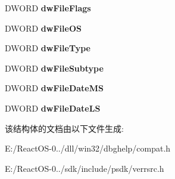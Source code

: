 \begin{DoxyCompactItemize}
\item 
\mbox{\label{structtag_v_s___f_i_x_e_d_f_i_l_e_i_n_f_o_ad9b248f2dfa572f6acb52eb2ff4ae14f}} 
D\+W\+O\+RD {\bfseries dw\+File\+Flags}
\item 
\mbox{\label{structtag_v_s___f_i_x_e_d_f_i_l_e_i_n_f_o_a16df3dd0691d11173a57c52cc67a4fd6}} 
D\+W\+O\+RD {\bfseries dw\+File\+OS}
\item 
\mbox{\label{structtag_v_s___f_i_x_e_d_f_i_l_e_i_n_f_o_a712ee7c0b1cbca219ac582b4bf07517f}} 
D\+W\+O\+RD {\bfseries dw\+File\+Type}
\item 
\mbox{\label{structtag_v_s___f_i_x_e_d_f_i_l_e_i_n_f_o_ae5fa0522fb4be66a3862f85494f48ae6}} 
D\+W\+O\+RD {\bfseries dw\+File\+Subtype}
\item 
\mbox{\label{structtag_v_s___f_i_x_e_d_f_i_l_e_i_n_f_o_af1310e673f25686d5355e8a2799fac11}} 
D\+W\+O\+RD {\bfseries dw\+File\+Date\+MS}
\item 
\mbox{\label{structtag_v_s___f_i_x_e_d_f_i_l_e_i_n_f_o_a4165bdb65db75b917511997445167777}} 
D\+W\+O\+RD {\bfseries dw\+File\+Date\+LS}
\end{DoxyCompactItemize}


该结构体的文档由以下文件生成\+:\begin{DoxyCompactItemize}
\item 
E\+:/\+React\+O\+S-\/0../dll/win32/dbghelp/compat.\+h\item 
E\+:/\+React\+O\+S-\/0../sdk/include/psdk/verrsrc.\+h\end{DoxyCompactItemize}
